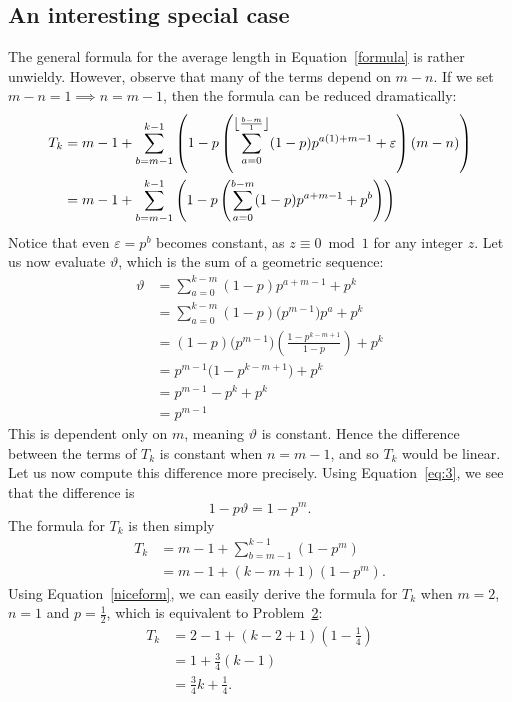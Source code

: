 \subsection{An interesting special case}
The general formula for the average length in Equation~\ref{formula} is rather unwieldy. However, observe that many of the terms depend on $m-n$. If we set  $m-n = 1 \implies n = m - 1$, then the formula can be reduced dramatically:
\begin{align}
  T_k &= m-1+\sum _{b=m-1}^{k-1} \left(1-p \left(\sum _{a=0}^{\floor*{\frac{b-m}{1}} } (1-p) p^{a (1)+m-1}+\varepsilon\right) (m-n)\right) \nonumber \\
      &= m-1+\sum _{b=m-1}^{k-1} \left(1-p \left(\sum _{a=0}^{b-m} (1-p) p^{a+m-1}+ p^{b} \right) \right) \label{eq:3}
\end{align}
Notice that even $\varepsilon = p^{b}$ becomes constant, as $z \equiv 0 \bmod 1$ for any integer  $z$. Let us now evaluate $\vartheta$, which is the sum of a geometric sequence:
\begin{align*}
  \vartheta &= \sum_{a=0}^{k-m} (1-p)p^{a+m-1} + p^k \\
            &= \sum_{a=0}^{k-m} (1-p)\bigl(p^{m-1}\bigr)p^{a} + p^k \\
            &= (1-p)\bigl(p^{m-1}\bigr)\left(\frac{1-p^{k-m+1}}{1-p}\right) + p^k \\
            &= p^{m-1}\bigl(1-p^{k-m+1}\bigr) + p^k \\
            &= p^{m-1} - p^{k} + p^{k} \\
            &= p^{m-1}
\end{align*}
This is dependent only on $m$, meaning $\vartheta$ is constant. Hence the difference between the terms of $T_k$ is constant when $n = m-1$, and so $T_k$ would be linear. Let us now compute this difference more precisely. Using Equation~\ref{eq:3}, we see that the difference is \[
  1-p\vartheta = 1-p^{m}
.\] The formula for $T_k$ is then simply 
\begin{align}
  T_k &= m-1 + \sum_{b=m-1}^{k-1} \left(1-p^m\right) \nonumber \\
      &= m-1 + (k-m+1)\left(1 - p^m\right). \label{niceform}
\end{align}
Using Equation~\ref{niceform}, we can easily derive the formula for $T_k$ when $m = 2$, $n = 1$ and $p = \frac{1}{2}$, which is equivalent to Problem~\hyperlink{p2}{2}: 
\begin{align*}
  T_k &= 2 - 1 + (k-2+1)\left(1 - \frac{1}{4}\right) \\
      &= 1 + \frac{3}{4}(k-1) \\
      &= \frac{3}{4}k + \frac{1}{4}.
\end{align*}

